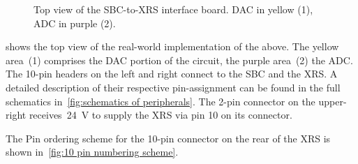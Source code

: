
            \begin{figure}[h]
                \centering
                
                \caption[Top view of the SBC-to-XRS interface board]{Top view of the SBC-to-XRS interface board. DAC in yellow (1), ADC in purple (2).}%
                \label{fig:top view interface board}
            \end{figure}\par\medskip

             shows the top view of the real-world implementation of the above.
            The yellow area~(1) comprises the DAC portion of the circuit, the purple area~(2) the ADC.
            The 10-pin headers on the left and right connect to the SBC and the XRS.
            A detailed description of their respective pin-assignment can be found in the full schematics in~\cref{fig:schematics of peripherals}.
            The 2-pin connector on the upper-right receives~\qty{24}{\volt} to supply the XRS via pin 10 on its connector.

            The Pin ordering scheme for the 10-pin connector on the rear of the XRS is shown in~\cref{fig:10 pin numbering scheme}.